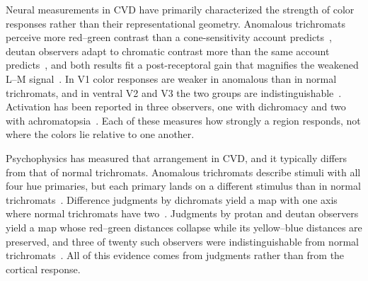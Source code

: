 Neural measurements in CVD have primarily characterized the strength of color responses rather than their representational geometry.  Anomalous trichromats perceive more red--green contrast than a cone-sensitivity account predicts~\citep{boehm2014}, deutan observers adapt to chromatic contrast more than the same account predicts~\citep{basim2025}, and both results fit a post-receptoral gain that magnifies the weakened L--M signal~\citep{webster2015}. In V1 color responses are weaker in anomalous than in normal trichromats, and in ventral V2 and V3 the two groups are indistinguishable~\citep{tregillus2021}. Activation has been reported in three observers, one with dichromacy and two with achromatopsia~\citep{rina2024}. Each of these measures how strongly a region responds, not where the colors lie relative to one another.

Psychophysics has measured that arrangement in CVD, and it typically differs from that of normal trichromats. Anomalous trichromats describe stimuli with all four hue primaries, but each primary lands on a different stimulus than in normal trichromats~\citep{emery2021}. Difference judgments by dichromats yield a map with one axis where normal trichromats have two~\citep{saysani2018}. Judgments by protan and deutan observers yield a map whose red--green distances collapse while its yellow--blue distances are preserved, and three of twenty such observers were indistinguishable from normal trichromats~\citep{ohkoba2021}. All of this evidence comes from judgments rather than from the cortical response.

